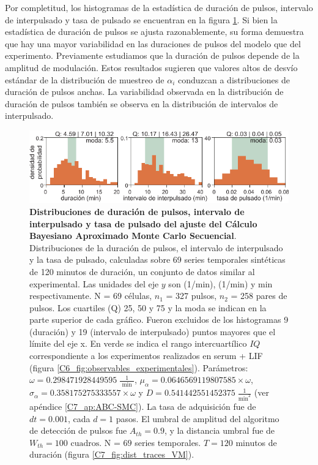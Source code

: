 \documentclass[./main.tex]{subfiles}
\begin{document}
Por completitud, los histogramas de la estadística de duración de pulsos, intervalo de interpulsado y tasa de pulsado se encuentran en la figura \ref{C7_fig:dist_param_evaluation_hist}. Si bien la estadística de duración de pulsos se ajusta razonablemente, su forma demuestra que hay una mayor variabilidad en las duraciones de pulsos del modelo que del experimento. Previamente estudiamos que la duración de pulsos depende de la amplitud de modulación. Estos resultados sugieren que valores altos de desvío estándar de la distribución de muestreo de $\alpha_i$ conduzcan a distribuciones de duración de pulsos anchas.  La variabilidad observada en la distribución de duración de pulsos también se observa en la distribución de intervalos de interpulsado.


\begin{figure}
    \centering
    \includegraphics[width=1\columnwidth]{figures/chapter7/C7_dist_validation_hist.pdf} 
    \caption{\textbf{Distribuciones de duración de pulsos, intervalo de interpulsado y tasa de pulsado del ajuste del Cálculo Bayesiano Aproximado Monte Carlo Secuencial}. Distribuciones de la duración de pulsos, el intervalo de interpulsado y la tasa de pulsado, calculadas sobre 69 series temporales sintéticas de 120 minutos de duración, un conjunto de datos similar al experimental. Las unidades del eje $y$ son (1/min), (1/min) y min respectivamente. N = 69 células, $n_1$ = 327 pulsos, $n_2$ = 258 pares de pulsos. Los cuartiles (Q) 25, 50 y 75 y la moda se indican en la parte superior de cada gráfico. Fueron excluidos de los histogramas 9 (duración) y 19 (intervalo de interpulsado) puntos mayores que el límite del eje x. En verde se indica el rango intercuartílico $IQ$ correspondiente a los experimentos realizados en serum + LIF (figura \ref{C6_fig:observables_experimentales}). Parámetros:  $\omega = 0.298471928449595 \; \frac{1}{\text{ min }}$, $\mu_{\alpha} = 0.0646569119807585 \times \omega$, $ \sigma_{\alpha} = 0.358175275333557  \times \omega$ y $D = 0.541442551452375 \; \frac{1}{\text{min}^{2}}$ (ver apéndice \ref{C7_ap:ABC-SMC}). La tasa de adquisición fue de $dt = 0.001$, cada $d = 1$ pasos. El umbral de amplitud del algoritmo de detección de pulsos fue $A_{th} = 0.9$, y la distancia umbral fue de $W_{th} = 100\text{ cuadros}$. N = $69$ series temporales. $T = 120$ minutos de duración (figura \ref{C7_fig:dist_traces_VM}).}
    \label{C7_fig:dist_param_evaluation_hist}
\end{figure} 
\end{document}
